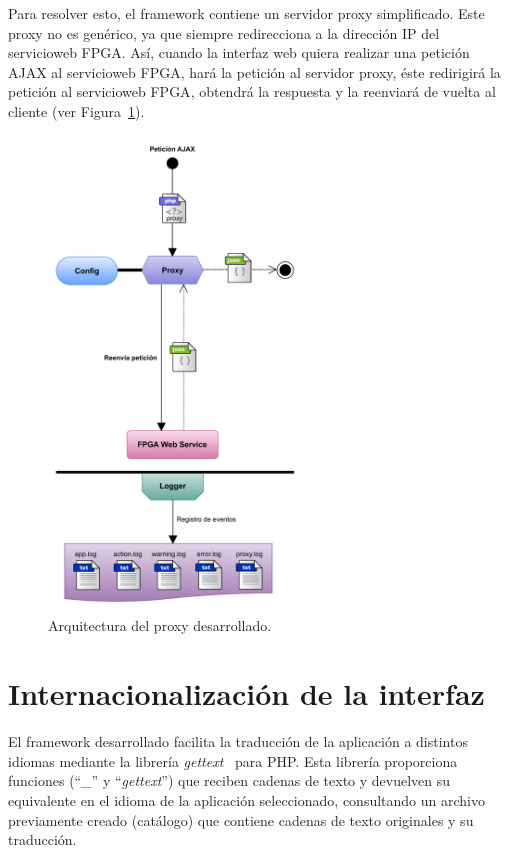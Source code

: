 Para resolver esto, el \gls{framework} contiene un servidor \gls{proxy} simplificado.
Este \gls{proxy} no es genérico, ya que siempre redirecciona a la dirección IP del \gls{servicioweb} \gls{FPGA}.
Así, cuando la interfaz web quiera realizar una petición \gls{AJAX} al \gls{servicioweb} \gls{FPGA}, hará la petición al servidor \gls{proxy}, éste redirigirá la petición al \gls{servicioweb} \gls{FPGA}, obtendrá la respuesta y la reenviará de vuelta al cliente (ver Figura~\ref{fig:proxy}).

\begin{figure}[!htp]
  \centering
  \includegraphics[width=0.6\textwidth,clip=true]{graphics/proxy}
  \caption{Arquitectura del proxy desarrollado.}
  \label{fig:proxy}
\end{figure}

\section{Internacionalización de la interfaz\label{extra:mvc:i18n}}

El \gls{framework} desarrollado facilita la traducción de la aplicación a distintos idiomas mediante la librería \textit{gettext}~\cite{gettext} para \gls{PHP}.
Esta librería proporciona funciones (``\textit{\_}'' y ``\textit{gettext}'') que reciben cadenas de texto y devuelven su equivalente en el idioma de la aplicación seleccionado, consultando un archivo previamente creado (catálogo) que contiene cadenas de texto originales y su traducción.

